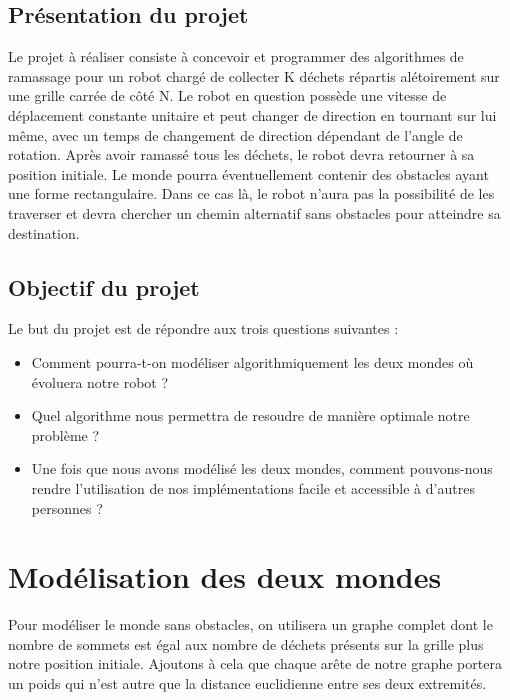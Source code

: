 \documentclass{report}
\begin{document}
\subsection{\Large Présentation du projet}
\hspace{0,5cm} \Large Le projet \`a  r\'ealiser consiste \`a concevoir et programmer des algorithmes de ramassage pour un robot charg\'e de collecter K d\'echets r\'epartis al\'etoirement
sur une grille carr\'ee de c\^ot\'e N. Le robot en question poss\`ede une vitesse de d\'eplacement constante unitaire et peut changer de direction en tournant sur lui m\^eme, avec un temps de changement
de direction d\'ependant de l'angle de rotation. Apr\`es avoir ramass\'e tous les d\'echets, le robot devra retourner \`a sa position initiale.
Le monde pourra \'eventuellement contenir des obstacles ayant une forme rectangulaire. Dans ce cas l\`a, le robot n'aura pas la possibilit\'    e de les traverser et devra chercher un chemin alternatif
sans obstacles pour atteindre sa destination.

\subsection{\Large Objectif du projet}
\hspace{0,5cm} \Large Le but du projet est de r\'epondre aux trois questions suivantes : \\
\hspace{1 cm} 
\begin{itemize}
\item Comment pourra-t-on mod\'eliser algorithmiquement les deux mondes o\`u \'evoluera notre robot ?
\item Quel algorithme nous permettra de resoudre de mani\`ere optimale notre probl\`eme ?
\item Une fois que nous avons mod\'elis\'e les deux mondes, comment pouvons-nous rendre l'utilisation de nos impl\'ementations facile et accessible à d'autres personnes ?
\end{itemize}

\newpage
\section{\Large Mod\'elisation des deux mondes}
\hspace{0,5 cm} \Large Pour mod\'eliser le monde sans obstacles, on utilisera un graphe complet dont le nombre de sommets est \'egal aux nombre de d\'echets pr\'esents sur la grille plus notre 
position initiale. Ajoutons \`a cela que chaque ar\^ete de notre graphe portera un poids qui n'est autre que la distance euclidienne entre ses deux extremit\'es.
\end{document}
